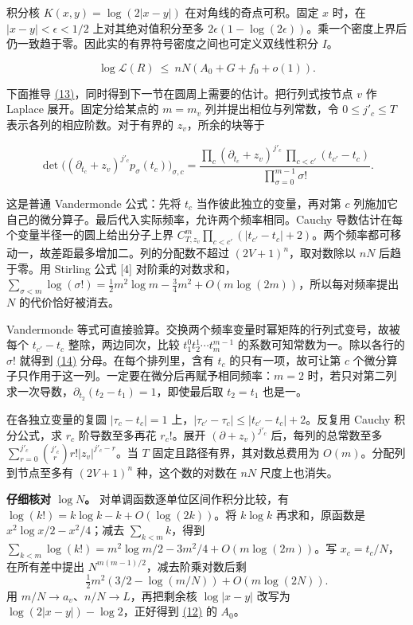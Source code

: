 \documentclass[11pt,a4paper]{article}
\begin{document}
积分核 \(K(x,y)=\log(2|x-y|)\) 在对角线的奇点可积。固定 \(x\) 时，在 \(|x-y|<\epsilon<1/2\) 上对其绝对值积分至多 \(2\epsilon(1-\log(2\epsilon))\)。乘一个密度上界后仍一致趋于零。因此实的有界符号密度之间也可定义双线性积分 \(I\)。

\[
 \log\mathcal L(R)\ \le\ nN(A_0+G+f_0+o(1)).                              \tag{13}\label{eq:13}
\]

下面推导 \hyperref[eq:13]{(13)}，同时得到下一节在圆周上需要的估计。把行列式按节点 \(v\) 作 Laplace 展开。固定分给某点的 \(m=m_v\) 列并提出相位与列常数，令 \(0\le j'_c\le T\) 表示各列的相应阶数。对于有界的 \(z_v\)，所余的块等于

\[
 \det\big((\partial_{t_c}+z_v)^{j'_c}p_\sigma(t_c)\big)_{\sigma,c}
 =\frac{\prod_c(\partial_{t_c}+z_v)^{j'_c}\,
               \prod_{c<c'}(t_{c'}-t_c)}{\prod_{\sigma=0}^{m-1}\sigma!}.   \tag{14}\label{eq:14}
\]

这是普通 Vandermonde 公式：先将 \(t_c\) 当作彼此独立的变量，再对第 \(c\) 列施加它自己的微分算子。最后代入实际频率，允许两个频率相同。Cauchy 导数估计在每个变量半径一的圆上给出分子上界 \(C_{T,z_v}^{m}\prod_{c<c'}(|t_{c'}-t_c|+2)\)。两个频率都可移动一，故差距最多增加二。列的分配数不超过 \((2V+1)^n\)，取对数除以 \(nN\) 后趋于零。用 Stirling 公式 {[}4{]} 对阶乘的对数求和，\(\sum_{\sigma<m}\log(\sigma!)=\frac12m^2\log m-\frac34m^2+O(m\log(2m))\)，所以每对频率提出 \(N\) 的代价恰好被消去。

Vandermonde 等式可直接验算。交换两个频率变量时幂矩阵的行列式变号，故被每个 \(t_{c'}-t_c\) 整除，两边同次，比较 \(t_1^0t_2^1\cdots t_m^{m-1}\) 的系数可知常数为一。除以各行的 \(\sigma!\) 就得到 \hyperref[eq:14]{(14)} 分母。在每个排列里，含有 \(t_c\) 的只有一项，故可让第 \(c\) 个微分算子只作用于这一列。一定要在微分后再赋予相同频率：\(m=2\) 时，若只对第二列求一次导数，\(\partial_{t_2}(t_2-t_1)=1\)，即使最后取 \(t_2=t_1\) 也是一。

在各独立变量的复圆 \(|\tau_c-t_c|=1\) 上，\(|\tau_{c'}-\tau_c|\le|t_{c'}-t_c|+2\)。反复用 Cauchy 积分公式，求 \(r_c\) 阶导数至多再花 \(r_c!\)。展开 \((\partial+z_v)^{j'_c}\) 后，每列的总常数至多 \(\sum_{r=0}^{j'_c}\binom{j'_c}r r!|z_v|^{j'_c-r}\)。当 \(T\) 固定且路径有界，其对数总费用为 \(O(m)\)。分配列到节点至多有 \((2V+1)^n\) 种，这个数的对数在 \(nN\) 尺度上也消失。

\textbf{仔细核对 \(\log N\)。} 对单调函数逐单位区间作积分比较，有 \(\log(k!)=k\log k-k+O(\log(2k))\)。将 \(k\log k\) 再求和，原函数是 \(x^2\log x/2-x^2/4\)；减去 \(\sum_{k<m}k\)，得到 \(\sum_{k<m}\log(k!)=m^2\log m/2-3m^2/4+O(m\log(2m))\)。写 \(x_c=t_c/N\)，在所有差中提出 \(N^{m(m-1)/2}\)，减去阶乘对数后剩 \[
 \tfrac12m^2(3/2-\log(m/N))+O(m\log(2N)).
\] 用 \(m/N\to a_v\)、\(n/N\to L\)，再把剩余核 \(\log|x-y|\) 改写为 \(\log(2|x-y|)-\log2\)，正好得到 \hyperref[eq:12]{(12)} 的 \(A_0\)。
\end{document}
